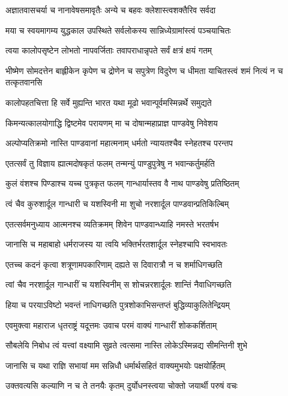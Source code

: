 \twolineshloka
{अज्ञातवासचर्या च नानावेषसमावृतैः}
{अन्ये च बहवः क्लेशास्त्वशक्तैरिव सर्वदा}


\twolineshloka
{मया च स्वयमागम्य युद्धकाल उपस्थिते}
{सर्वलोकस्य सान्निध्येग्रामांस्त्वं पञ्चयाचितः}


\twolineshloka
{त्वया कालोपसृष्टेन लोभतो नापवर्जिताः}
{तवापराधान्नृपते सर्वं क्षत्रं क्षयं गतम्}


\threelineshloka
{भीष्मेण सोमदत्तेन बाह्लीकेन कृपेण च}
{द्रोणेन च सपुत्रेण विदुरेण च धीमता}
{याचितस्त्वं शमं नित्यं न च तत्कृतवानसि}


\twolineshloka
{कालोपहतचित्ता हि सर्वे मुह्यन्ति भारत}
{यथा मूढो भवान्पूर्वमस्मिन्नर्थे समुद्यते}


\twolineshloka
{किमन्यत्कालयोगाद्धि द्विष्टमेव परायणम्}
{मा च दोषान्महाप्राज्ञ पाण्डवेषु निवेशय}


\twolineshloka
{अल्पोप्यतिक्रमो नास्ति पाण्डवानां महात्मनाम्}
{धर्मतो न्यायतश्चैव स्नेहतश्च परन्तप}


\twolineshloka
{एतत्सर्वं तु विज्ञाय ह्यात्मदोषकृतं फलम्}
{तन्मन्युं पाण्डुपुत्रेषु न भवान्कर्तुमर्हति}


\twolineshloka
{कुलं वंशश्च पिण्डाश्च यच्च पुत्रकृत फलम्}
{गान्धार्यास्तव वै नाथ पाण्डवेषु प्रतिष्ठितम्}


\twolineshloka
{त्वं चैव कुरुशार्दूल गान्धारी च यशस्विनी}
{मा शुचो नरशार्दूल पाण्डवान्प्रतिकिल्बिम्}


\twolineshloka
{एतत्सर्वमनुध्याय आत्मनश्च व्यतिक्रमम्}
{शिवेन पाण्डवान्ध्याहि नमस्ते भरतर्षभ}


\twolineshloka
{जानासि च महाबाहो धर्मराजस्य या त्वयि}
{भक्तिर्भरतशार्दूल स्नेहश्चापि स्वभावतः}


\twolineshloka
{एतच्च कदनं कृत्वा शत्रूणामपकारिणाम्}
{दह्यते स दिवारात्रौ न च शर्माधिगच्छति}


\twolineshloka
{त्वां चैव नरशार्दूल गान्धारीं च यशस्विनीम्}
{स शोचन्नरशार्दूलः शान्तिं नैवाधिगच्छति}


\twolineshloka
{हिया च परयाऽविष्टो भवन्तं नाधिगच्छति}
{पुत्रशोकाभिसन्तप्तं बुद्धिव्याकुलितेन्द्रियम्}


\twolineshloka
{एवमुक्त्वा महाराज धृतराष्ट्रं यदूत्तमः}
{उवाच परमं वाक्यं गान्धारीं शोककर्शिताम्}


\twolineshloka
{सौबलेयि निबोध त्वं यत्त्वां वक्ष्यामि सुव्रते}
{त्वत्समा नास्ति लोकेऽस्मिन्नद्य सीमन्तिनी शुभे}


\twolineshloka
{जानासि च यथा राज्ञि सभायां मम सन्निधौ}
{धर्मार्थसहितं वाक्यमुभयोः पक्षयोर्हितम्}


\twolineshloka
{उक्तवत्यसि कल्याणि न च ते तनयैः कृतम्}
{दुर्योधनस्त्वया चोक्तो जयार्थी परुषं वचः}



